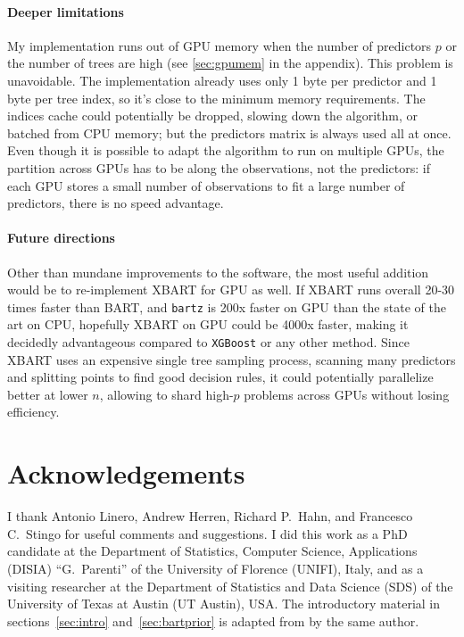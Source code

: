 \documentclass{article}
\begin{document}
    \paragraph{Deeper limitations}

    My implementation runs out of GPU memory when the number of predictors $p$ or the number of trees are high (see \autoref{sec:gpumem} in the appendix). This problem is unavoidable. The implementation already uses only 1 byte per predictor and 1 byte per tree index, so it's close to the minimum memory requirements. The indices cache could potentially be dropped, slowing down the algorithm, or batched from CPU memory; but the predictors matrix is always used all at once. Even though it is possible to adapt the algorithm to run on multiple GPUs, the partition across GPUs has to be along the observations, not the predictors: if each GPU stores a small number of observations to fit a large number of predictors, there is no speed advantage.

    \paragraph{Future directions}

    Other than mundane improvements to the software, the most useful addition would be to re-implement XBART \citep{he2021} for GPU as well. If XBART runs overall 20-30 times faster than BART, and \texttt{bartz} is 200x faster on GPU than the state of the art on CPU, hopefully XBART on GPU could be 4000x faster, making it decidedly advantageous compared to \texttt{XGBoost} or any other method. Since XBART uses an expensive single tree sampling process, scanning many predictors and splitting points to find good decision rules, it could potentially parallelize better at lower $n$, allowing to shard high-$p$ problems across GPUs without losing efficiency.

    \section*{Acknowledgements}


    I thank Antonio Linero, Andrew Herren, Richard P.\ Hahn, and Francesco C.\ Stingo for useful comments and suggestions. I did this work as a PhD candidate at the Department of Statistics, Computer Science, Applications (DISIA) ``G.~Parenti'' of the University of Florence (UNIFI), Italy, and as a visiting researcher at the Department of Statistics and Data Science (SDS) of the University of Texas at Austin (UT Austin), USA. The introductory material in sections~\ref{sec:intro} and~\ref{sec:bartprior} is adapted from \citet{petrillo2024f} by the same author.
\end{document}
